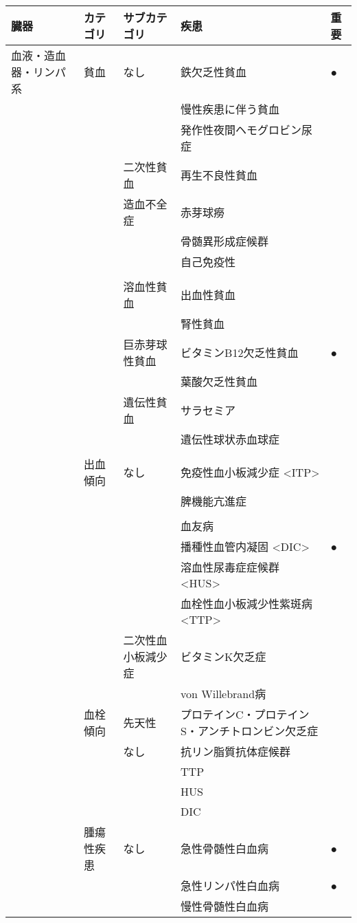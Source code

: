 \begin{xltabular}{\linewidth}{XXXXX}
\caption{\label{tbl:diseases}} \\
\toprule
臓器 & カテゴリ & サブカテゴリ & 疾患 & 重要 \\
\midrule
\endhead
血液・造血器・リンパ系 & 貧血 & なし & 鉄欠乏性貧血 & ● \\
 &  &  & 慢性疾患に伴う貧血 &  \\
 &  &  & 発作性夜間ヘモグロビン尿症 &  \\
 &  & 二次性貧血 & 再生不良性貧血 &  \\
 &  & 造血不全症 & 赤芽球癆 &  \\
 &  &  & 骨髄異形成症候群 &  \\
 &  &  & 自己免疫性 &  \\
 &  &  &  &  \\
 &  & 溶血性貧血 & 出血性貧血 &  \\
 &  &  & 腎性貧血 &  \\
 &  & 巨赤芽球性貧血 & ビタミンB12欠乏性貧血 & ● \\
 &  &  & 葉酸欠乏性貧血 &  \\
 &  & 遺伝性貧血 & サラセミア &  \\
 &  &  & 遺伝性球状赤血球症 &  \\
 &  &  &  &  \\
 & 出血傾向 & なし & 免疫性血小板減少症 <ITP> &  \\
 &  &  & 脾機能亢進症 &  \\
 &  &  &  &  \\
 &  &  & 血友病 &  \\
 &  &  & 播種性血管内凝固 <DIC> & ● \\
 &  &  & 溶血性尿毒症症候群 <HUS> &  \\
 &  &  & 血栓性血小板減少性紫斑病 <TTP> &  \\
 &  & 二次性血小板減少症 & ビタミンK欠乏症 &  \\
 &  &  & von Willebrand病 &  \\
 & 血栓傾向 & 先天性 & プロテインC・プロテインS・アンチトロンビン欠乏症 &  \\
 &  & なし & 抗リン脂質抗体症候群 &  \\
 &  &  & TTP &  \\
 &  &  & HUS &  \\
 &  &  & DIC &  \\
 & 腫瘍性疾患 & なし & 急性骨髄性白血病 & ● \\
 &  &  & 急性リンパ性白血病 & ● \\
 &  &  & 慢性骨髄性白血病 &  \\

\end{xltabular}
